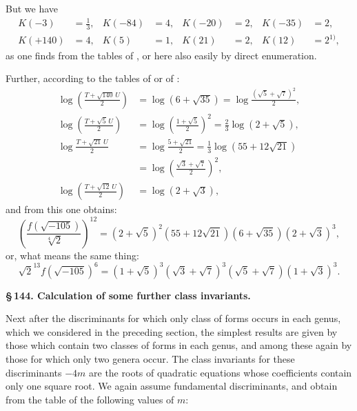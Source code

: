 But we have
\[
\begin{aligned}
K(-3) &= \tfrac{1}{3}, & K(-84) &= 4, & K(-20) &= 2, & K(-35) &= 2, \\
K(+140) &= 4, & K(5) &= 1, & K(21) &= 2, & K(12) &= 2^{1)},
\end{aligned}
\]
\begingroup\renewcommand{\thefootnote}{1)}\endgroup
as one finds from the tables of , or here also easily by direct enumeration.

Further, according to the tables of  or of :
\[
\begin{aligned}
\log\left(\frac{T+\sqrt{140}\,U}{2}\right) &= \log(6+\sqrt{35}) = \log\frac{(\sqrt{5}+\sqrt{7})^2}{2}, \\
\log\left(\frac{T+\sqrt{5}\,U}{2}\right) &= \log\left(\frac{1+\sqrt{5}}{2}\right)^2 = \tfrac{2}{3}\log(2+\sqrt{5}), \\
\log\frac{T+\sqrt{21}\,U}{2} &= \log\frac{5+\sqrt{21}}{2} = \tfrac{1}{3}\log(55+12\sqrt{21}) \\
&= \log\left(\frac{\sqrt{3}+\sqrt{7}}{2}\right)^2, \\
\log\left(\frac{T+\sqrt{12}\,U}{2}\right) &= \log(2+\sqrt{3}),
\end{aligned}
\]
and from this one obtains:
\[
\left(\frac{f(\sqrt{-105})}{\sqrt[4]{2}}\right)^{12} = (2+\sqrt{5})^2(55+12\sqrt{21})(6+\sqrt{35})(2+\sqrt{3})^3,
\]
or, what means the same thing:
\[
\sqrt{2}^{13}f(\sqrt{-105})^6 = (1+\sqrt{5})^3(\sqrt{3}+\sqrt{7})^3(\sqrt{5}+\sqrt{7})(1+\sqrt{3})^3.
\]

\begin{center}
\textbf{\S\,144. Calculation of some further class invariants.}
\end{center}

Next after the discriminants for which only  class of forms occurs in each genus, which we considered in the preceding section, the simplest results are given by those which contain two classes of forms in each genus, and among these again by those for which only two genera occur. The class invariants for these discriminants $-4m$ are the roots of quadratic equations whose coefficients contain only one square root. We again assume fundamental discriminants, and obtain from the table of  the following values of $m$:
